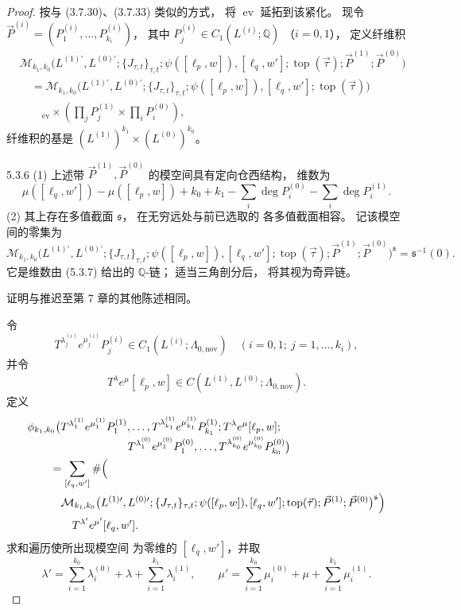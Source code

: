 \begin{proof}
按与 (3.7.30)、(3.7.33) 类似的方式，
将 $\operatorname{ev}$
延拓到该紧化。
现令
$\vec P^{(i)}
=(P_1^{(i)},\ldots,P_{k_i}^{(i)})$，
其中
$P_j^{(i)}\in C_1(L^{(i)};\mathbb Q)$
（$i=0,1$），
定义纤维积
\[
\begin{aligned}
&\mathcal M_{k_1,k_0}
\bigl(
 L^{(1)\prime},L^{(0)\prime};
 \{J_{\tau,t}\}_{\tau,t};
 \psi([\ell_p,w]),[\ell_q,w'];
 \operatorname{top}(\vec\tau);
 \vec P^{(1)};\vec P^{(0)}
\bigr)
\\
&\quad=
\mathcal M_{k_1,k_0}
\bigl(
 L^{(1)\prime},L^{(0)\prime};
 \{J_{\tau,t}\}_{\tau,t};
 \psi([\ell_p,w]),[\ell_q,w'];
 \operatorname{top}(\vec\tau)
\bigr)
\\
&\hspace{2em}
{}_{\operatorname{ev}}\!\times
\left(
 \prod_jP_j^{(1)}
 \times\prod_iP_i^{(0)}
\right),
\end{aligned}
\]
纤维积的基是
$(L^{(1)})^{k_1}\times(L^{(0)})^{k_0}$。

\begin{proposition}{5.3.6}\label{prop:5-3-6}
\textup{(1)}
上述带 $\vec P^{(1)},\vec P^{(0)}$
的模空间具有定向仓西结构，
维数为
\begin{equation}
\mu([\ell_q,w'])
-\mu([\ell_p,w])
+k_0+k_1
-\sum_i\deg P_i^{(0)}
-\sum_i\deg P_i^{(1)}.
\tag{5.3.7}\label{eq:5-3-7}
\end{equation}
\textup{(2)}
其上存在多值截面 $\mathfrak s$，
在无穷远处与前已选取的
各多值截面相容。
记该模空间的零集为
\[
\mathcal M_{k_1,k_0}
\bigl(
 L^{(1)\prime},L^{(0)\prime};
 \{J_{\tau,t}\}_{\tau,t};
 \psi([\ell_p,w]),[\ell_q,w'];
 \operatorname{top}(\vec\tau);
 \vec P^{(1)};\vec P^{(0)}
\bigr)^{\mathfrak s}
=\mathfrak s^{-1}(0).
\]
它是维数由 (5.3.7) 给出的
$\mathbb Q$-链；
适当三角剖分后，
将其视为奇异链。
\end{proposition}
证明与推迟至第 7 章的其他陈述相同。

令
\[
T^{\lambda_j^{(i)}}e^{\mu_j^{(i)}}P_j^{(i)}
\in C_1(L^{(i)};\Lambda_{0,\mathrm{nov}})
\quad(i=0,1;\ j=1,\ldots,k_i),
\]
并令
\[
T^\lambda e^\mu[\ell_p,w]
\in C(L^{(1)},L^{(0)};\Lambda_{0,\mathrm{nov}}).
\]
定义
\[
\begin{aligned}
&\phi_{k_1,k_0}
\bigl(
 T^{\lambda_1^{(1)}}e^{\mu_1^{(1)}}P_1^{(1)},
 \ldots,
 T^{\lambda_{k_1}^{(1)}}e^{\mu_{k_1}^{(1)}}P_{k_1}^{(1)};
 T^\lambda e^\mu[\ell_p,w];
\\[-1mm]
&\hspace{9em}
 T^{\lambda_1^{(0)}}e^{\mu_1^{(0)}}P_1^{(0)},
 \ldots,
 T^{\lambda_{k_0}^{(0)}}e^{\mu_{k_0}^{(0)}}P_{k_0}^{(0)}
\bigr)
\\
&\qquad=
\sum_{[\ell_q,w']}
\#
\Bigl(
\\
&\qquad\quad
 \mathcal M_{k_1,k_0}
 \bigl(
 L^{(1)\prime},L^{(0)\prime};
 \{J_{\tau,t}\}_{\tau,t};
 \psi([\ell_p,w]),[\ell_q,w'];
 \operatorname{top}(\vec\tau);
 \vec P^{(1)};\vec P^{(0)}
 \bigr)^{\mathfrak s}
\Bigr)
\\
&\hspace{4em}
T^{\lambda'}e^{\mu'}[\ell_q,w'].
\end{aligned}
\]
求和遍历使所出现模空间
为零维的 $[\ell_q,w']$，并取
\[
\lambda'
=\sum_{i=1}^{k_0}\lambda_i^{(0)}
 +\lambda
 +\sum_{i=1}^{k_1}\lambda_i^{(1)},
\qquad
\mu'
=\sum_{i=1}^{k_0}\mu_i^{(0)}
 +\mu
 +\sum_{i=1}^{k_1}\mu_i^{(1)}.
\]


\end{proof}
